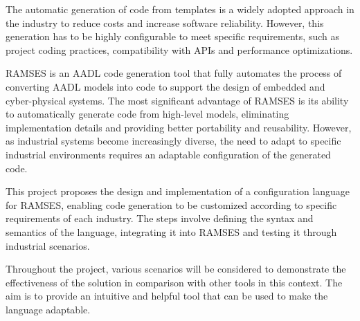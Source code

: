 
%

The automatic generation of code from templates is a widely adopted approach in the industry to reduce costs and increase software reliability. However, this generation has to be highly configurable to meet specific requirements, such as project coding practices, compatibility with APIs and performance optimizations.

RAMSES is an AADL code generation tool that fully automates the process of converting AADL models into code to support the design of embedded and cyber-physical systems. The most significant advantage of RAMSES is its ability to automatically generate code from high-level models, eliminating implementation details and providing better portability and reusability. However, as industrial systems become increasingly diverse, the need to adapt to specific industrial environments requires an adaptable configuration of the generated code.

This project proposes the design and implementation of a configuration language for RAMSES, enabling code generation to be customized according to specific requirements of each industry. The steps involve defining the syntax and semantics of the language, integrating it into RAMSES and testing it through industrial scenarios.

Throughout the project, various scenarios will be considered to demonstrate the effectiveness of the solution in comparison with other tools in this context. The aim is to provide an intuitive and helpful tool that can be used to make the language adaptable.

